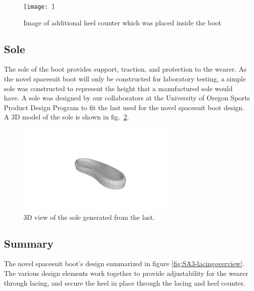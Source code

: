 \documentclass[defaultstyle,11pt]{thesis}
\begin{document}
\begin{figure}
\hypertarget{fig:SA3-heelcounter}{%
\centering
\texttt{[image: ]}
\caption{Image of additional heel counter which was placed inside the boot}\label{fig:SA3-heelcounter}
}
\end{figure}

\hypertarget{sole-1}{%
\subsection{Sole}\label{sole-1}}

The sole of the boot provides support, traction, and protection to the wearer.
As the novel spacesuit boot will only be constructed for laboratory testing, a simple sole was constructed to represent the height that a manufactured sole would have.
A sole was designed by our collaborators at the University of Oregon Sports Product Design Program to fit the last used for the novel spacesuit boot design.
A 3D model of the sole is shown in fig.~\ref{fig:SA3-solemold}.

\begin{figure}
\hypertarget{fig:SA3-solemold}{%
\centering
\includegraphics[width=0.7\textwidth,height=\textheight]{../fig/SA3/sole_3d.png}
\caption{3D view of the sole generated from the last.}\label{fig:SA3-solemold}
}
\end{figure}

\hypertarget{summary-4}{%
\subsection{Summary}\label{summary-4}}

The novel spacesuit boot's design summarized in figure \ref{fig:SA3-lacingoverview}.
The various design elements work together to provide adjustability for the wearer through lacing, and secure the heel in place through the lacing and heel counter.
\end{document}

